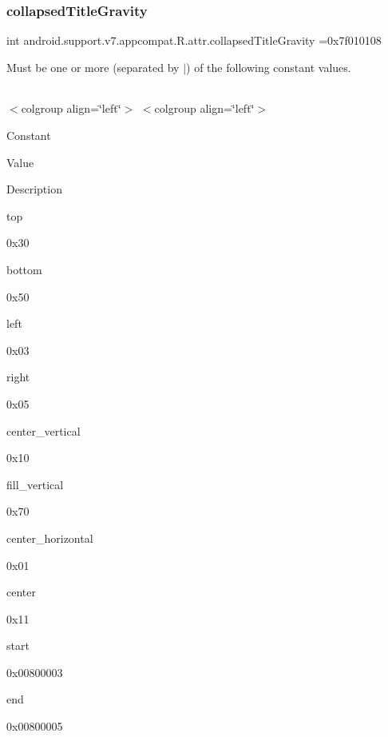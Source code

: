 \subsubsection{\texorpdfstring{collapsed\+Title\+Gravity}{collapsedTitleGravity}}
{\footnotesize\ttfamily int android.\+support.\+v7.\+appcompat.\+R.\+attr.\+collapsed\+Title\+Gravity =0x7f010108\hspace{0.3cm}{\ttfamily [static]}}

Must be one or more (separated by \textquotesingle{}$\vert$\textquotesingle{}) of the following constant values.

\tabulinesep=1mm
\begin{longtabu} spread 0pt [c]{*{0}{|X[-1]}|}
\hline
\end{longtabu}
$<$colgroup align=\char`\"{}left\char`\"{}$>$ $<$colgroup align=\char`\"{}left\char`\"{}$>$ 

Constant

Value

Description 

{\ttfamily top}

0x30

{\ttfamily bottom}

0x50

{\ttfamily left}

0x03

{\ttfamily right}

0x05

{\ttfamily center\+\_\+vertical}

0x10

{\ttfamily fill\+\_\+vertical}

0x70

{\ttfamily center\+\_\+horizontal}

0x01

{\ttfamily center}

0x11

{\ttfamily start}

0x00800003

{\ttfamily end}

0x00800005\mbox{\label{classandroid_1_1support_1_1v7_1_1appcompat_1_1R_1_1attr_af75636f95be73b48d5c2fc97f0f5cba5}} 
